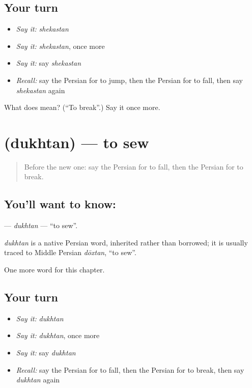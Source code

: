 \subsection*{Your turn}
\begin{itemize}
\raggedright
  \item \emph{Say it:} \emph{shekastan}
  \item \emph{Say it:} \emph{shekastan}, once more
  \item \emph{Say it:} say \emph{shekastan}
  \item \emph{Recall:} say the Persian for to jump, then the Persian for to fall, then say \emph{shekastan} again
\end{itemize}

\begin{tcolorbox}[breakable,colback=teal!4,colframe=teal!35!black,title={Before you move on}]
What does  mean? (\textquotedblleft{}To break\textquotedblright{}.) Say it once more.
\end{tcolorbox}
\section[\texorpdfstring{\fa{دوختن} (dukhtan)}{دوختن (dukhtan)}]{ (dukhtan) — to sew}

\label{lesson:FA-C132-dukhtan}



\begin{quote}
Before the new one: say the Persian for to fall, then the Persian for to break.
\end{quote}

\subsection*{You'll want to know: }
\textbf{} — \emph{dukhtan} — \textquotedblleft{}to sew\textquotedblright{}.

\begin{cousinweb}
\emph{dukhtan} is a native Persian word, inherited rather than borrowed; it is usually traced to Middle Persian \emph{dōxtan}, \textquotedblleft{}to sew\textquotedblright{}.
\end{cousinweb}

\begin{grammarlens}[title={What you've built}]
One more word for this chapter.
\end{grammarlens}

\subsection*{Your turn}
\begin{itemize}
\raggedright
  \item \emph{Say it:} \emph{dukhtan}
  \item \emph{Say it:} \emph{dukhtan}, once more
  \item \emph{Say it:} say \emph{dukhtan}
  \item \emph{Recall:} say the Persian for to fall, then the Persian for to break, then say \emph{dukhtan} again
\end{itemize}

